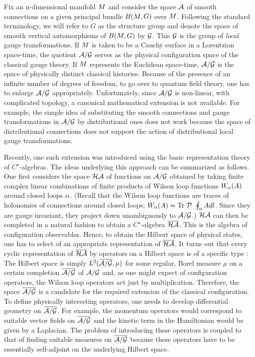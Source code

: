 Fix an n-dimensional manifold $\S$ and consider the space $\A$ of
smooth connections on a given principal bundle $B(\S, G)$ over $\S$.
Following the standard terminology, we will refer to $G$ as the
structure group and denote the space of smooth vertical automorphisms
of $B(\S,G)$ by $\G$. This $\G$ is the group of {\it local} gauge
transformations. If $\S$ is taken to be a Cauchy surface in a
Lorentzian space-time, the quotient $\ag$ serves as the physical
configuration space of the classical gauge theory. If $\S$ represents
the Euclidean space-time, $\ag$ is the space of physically distinct
classical histories. Because of the presence of an infinite number of
degrees of freedom, to go over to quantum field theory, one has to
enlarge $\ag$ appropriately. Unfortunately, since $\ag$ is non-linear,
with complicated topology, a canonical mathematical extension is not
available. For example, the simple idea of substituting the smooth
connections and gauge transformations in $\ag$ by distributional ones
does not work because the space of distributional connections does not
support the action of distributional local gauge transformations.

Recently, one such extension was introduced \cite{AI} using the basic
representation theory of $C^\star$-algebras. The ideas underlying this
approach can be summarized as follows. One first considers the space
$\HA$ of functions on $\ag$ obtained by taking finite complex linear
combinations of finite products of Wilson loop functions $W_{\a}(A)$
around closed loops $\a$.  (Recall that the Wilson loop functions are
traces of holonomies of connections around closed loops; $W_{\a}(A) =
{\rm Tr}\ {\cal P}\ \oint_{\a} A dl$. Since they are gauge invariant,
they project down unambiguously to $\ag$.) $\HA$ can then be completed
in a natural fashion to obtain a $C^\star$-algebra $\HAbar$. This is
the algebra of configuration observables. Hence, to obtain the Hilbert
space of physical states, one has to select of an appropriate
representation of $\HAbar$.  It turns out that every cyclic
representation of $\HAbar$ by operators on a Hilbert space is of a
specific type \cite{AI}: The Hilbert space is simply $L^2(\agb, \mu)$
for some regular, Borel measure $\mu$ on a certain completion $\agb$
of $\ag$ and, as one might expect of configuration operators, the
Wilson loop operators act just by multiplication. Therefore, the space
$\agb$ is a candidate for the required extension of the classical
configuration. To define physically interesting operators, one needs
to develop differential geometry on $\agb$.  For example, the momentum
operators would correspond to suitable vector fields on $\agb$ and the
kinetic term in the Hamiltonian would be given by a Laplacian. The
problem of introducing these operators is coupled to that of finding
suitable measures on $\agb$ because these operators have to be
essentially self-adjoint on the underlying Hilbert space.

